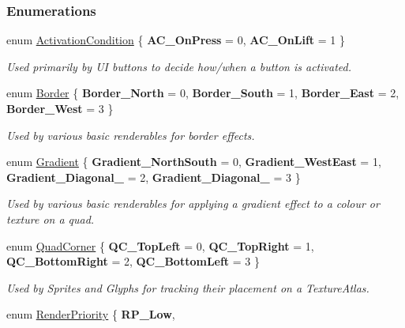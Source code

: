 \subsubsection*{Enumerations}
\begin{DoxyCompactItemize}
\item 
enum \hyperlink{namespaceMezzanine_1_1UI_aca58497951b1b9c7da10f214da3392f0}{ActivationCondition} \{ {\bfseries AC\_\-OnPress} =  0, 
{\bfseries AC\_\-OnLift} =  1
 \}
\begin{DoxyCompactList}\small\item\em Used primarily by UI buttons to decide how/when a button is activated. \item\end{DoxyCompactList}\item 
enum \hyperlink{namespaceMezzanine_1_1UI_a060de8b459e4991f4a1627166079c406}{Border} \{ {\bfseries Border\_\-North} =  0, 
{\bfseries Border\_\-South} =  1, 
{\bfseries Border\_\-East} =  2, 
{\bfseries Border\_\-West} =  3
 \}
\begin{DoxyCompactList}\small\item\em Used by various basic renderables for border effects. \item\end{DoxyCompactList}\item 
enum \hyperlink{namespaceMezzanine_1_1UI_a694cd1781f4196f8c391c9147cd41e8e}{Gradient} \{ {\bfseries Gradient\_\-NorthSouth} =  0, 
{\bfseries Gradient\_\-WestEast} =  1, 
{\bfseries Gradient\_\-Diagonal\_} =  2, 
{\bfseries Gradient\_\-Diagonal\_} =  3
 \}
\begin{DoxyCompactList}\small\item\em Used by various basic renderables for applying a gradient effect to a colour or texture on a quad. \item\end{DoxyCompactList}\item 
enum \hyperlink{namespaceMezzanine_1_1UI_a61a42a62e4838bc93b194886a363fe36}{QuadCorner} \{ {\bfseries QC\_\-TopLeft} =  0, 
{\bfseries QC\_\-TopRight} =  1, 
{\bfseries QC\_\-BottomRight} =  2, 
{\bfseries QC\_\-BottomLeft} =  3
 \}
\begin{DoxyCompactList}\small\item\em Used by Sprites and Glyphs for tracking their placement on a TextureAtlas. \item\end{DoxyCompactList}\item 
enum \hyperlink{namespaceMezzanine_1_1UI_ac4c753eb6b5d66350a243acc9ce54130}{RenderPriority} \{ {\bfseries RP\_\-Low}, 

\end{DoxyCompactItemize}
